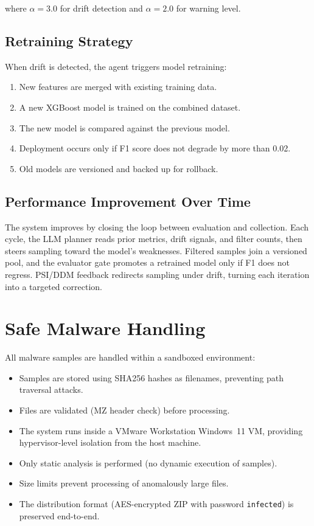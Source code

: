 \documentclass[12pt,a4paper]{article}
\begin{document}
where $\alpha = 3.0$ for drift detection and $\alpha = 2.0$ for warning level.

\subsection{Retraining Strategy}

When drift is detected, the agent triggers model retraining:
\begin{enumerate}
    \item New features are merged with existing training data.
    \item A new XGBoost model is trained on the combined dataset.
    \item The new model is compared against the previous model.
    \item Deployment occurs only if F1 score does not degrade by more than 0.02.
    \item Old models are versioned and backed up for rollback.
\end{enumerate}

\subsection{Performance Improvement Over Time}

The system improves by closing the loop between evaluation and collection. Each cycle, the LLM planner reads prior metrics, drift signals, and filter counts, then steers sampling toward the model's weaknesses. Filtered samples join a versioned pool, and the evaluator gate promotes a retrained model only if F1 does not regress. PSI/DDM feedback redirects sampling under drift, turning each iteration into a targeted correction.

\section{Safe Malware Handling}
\label{sec:safety}

All malware samples are handled within a sandboxed environment:

\begin{itemize}
    \item Samples are stored using SHA256 hashes as filenames, preventing path traversal attacks.
    \item Files are validated (MZ header check) before processing.
    \item The system runs inside a VMware Workstation Windows~11 VM, providing hypervisor-level isolation from the host machine.
    \item Only static analysis is performed (no dynamic execution of samples).
    \item Size limits prevent processing of anomalously large files.
    \item The distribution format (AES-encrypted ZIP with password \texttt{infected}) is preserved end-to-end.
\end{itemize}
\end{document}
